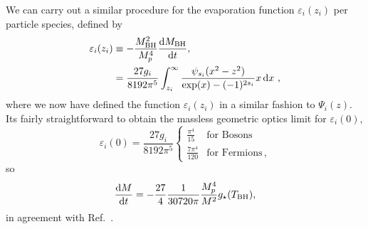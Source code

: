 \documentclass[aps,prd,reprint,twocolumn,preprintnumbers,floatfix,nofootinbib]{revtex4-1}
\newcommand{\TBH}{T_{\rm BH}}
\newcommand{\MBH}{M_{\rm BH}}
\newcommand{\MPL}{M_p}
\begin{document}
We can carry out a similar procedure for the evaporation function $\varepsilon_i(z_i)$ per particle species, defined by
\begin{align}
    \varepsilon_i(z_i)&\equiv-\frac{\MBH^2}{\MPL^4}\frac{\dd{\MBH}}{\dd{t}},\notag\\ 
    &=\frac{27 g_i}{8192\pi^5}\int_{z_i}^\infty\frac{\psi_{s_i}(x^2-z^2)}{\exp(x)-(-1)^{2s_i}}x\dd{x}\,,
\end{align}
where we now have defined the function $\varepsilon_i(z_i)$ in a similar fashion to $\Psi_i(z)$. Its fairly straightforward to obtain the massless geometric optics limit for $\varepsilon_i(0)$,
\begin{equation}
    \varepsilon_i(0)=\frac{27 g_i}{8192\pi^5}\begin{cases}
    \frac{\pi^4}{15} & \text{for Bosons}\\
    \frac{7 \pi^4}{120} & \text{for Fermions}\,,
    \end{cases}
\end{equation}
so 
\begin{equation}
    \dv{M}{t}=-\frac{27}{4}\frac{1}{30720\pi}\frac{\MPL^4}{M^2}g_{\star}(\TBH),
\end{equation}
in agreement with Ref.~\cite{Baldes:2020nuv}.
\end{document}

